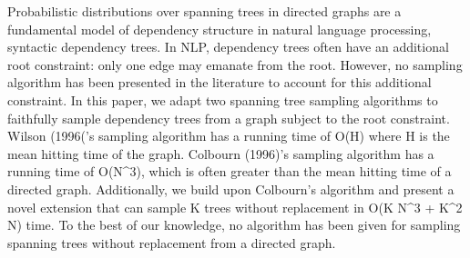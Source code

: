Probabilistic distributions over spanning trees in directed graphs are a fundamental model of dependency structure in natural language processing, syntactic dependency trees. In NLP, dependency trees often have an additional root constraint: only one edge may emanate from the root. However, no sampling algorithm has been presented in the literature to account for this additional constraint. In this paper, we adapt two spanning tree sampling algorithms to faithfully sample dependency trees from a graph subject to the root constraint. Wilson (1996('s sampling algorithm has a running time of O(H) where H is the mean hitting time of the graph. Colbourn (1996)'s sampling algorithm has a running time of O(N^3), which is often greater than the mean hitting time of a directed graph. Additionally, we build upon Colbourn's algorithm and present a novel extension that can sample K trees without replacement in O(K N^3 + K^2 N) time. To the best of our knowledge, no algorithm has been given for sampling spanning trees without replacement from a directed graph.
